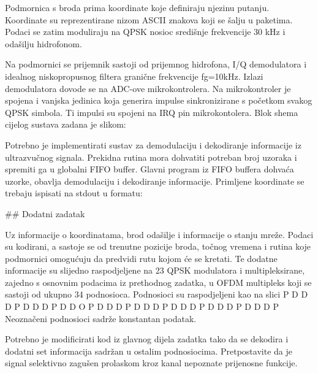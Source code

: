 Podmornica s broda prima koordinate koje definiraju njezinu putanju.
Koordinate su reprezentirane nizom ASCII znakova koji se šalju u paketima. Podaci se zatim moduliraju na QPSK nosioc središnje frekvencije 30 kHz i odašilju hidrofonom.

Na podmornici se prijemnik sastoji od prijemnog hidrofona, I/Q demodulatora i idealnog niskopropusnog filtera granične frekvencije fg=10kHz. Izlazi demodulatora dovode se na ADC-ove mikrokontrolera. Na mikrokontroler je spojena i vanjska jedinica koja generira impulse sinkronizirane s početkom svakog QPSK simbola. Ti impulsi su spojeni na IRQ pin mikrokontolera. Blok shema cijelog sustava zadana je slikom:

Potrebno je implementirati sustav za demodulaciju i dekodiranje informacije iz ultrazvučnog signala. Prekidna rutina mora dohvatiti potreban broj uzoraka i spremiti ga u globalni FIFO buffer. Glavni program iz FIFO buffera dohvaća uzorke, obavlja demodulaciju i dekodiranje informacije. Primljene koordinate se trebaju ispisati na stdout u formatu:



## Dodatni zadatak

Uz informacije o koordinatama, brod odašilje i informacije o stanju mreže. Podaci su kodirani, a sastoje se od trenutne pozicije broda, točnog vremena i rutina koje podmornici omogućuju da predvidi rutu kojom će se kretati. Te dodatne informacije su slijedno raspodjeljene na 23 QPSK modulatora i multipleksirane, zajedno s osnovnim podacima iz prethodnog zadatka, u OFDM multipleks koji se sastoji od ukupno 34 podnosioca. Podnosioci su raspodjeljeni kao na slici
P D D D P D D D P D D O P D D D P D D D P D D D P D D D P D D D P 
Neoznačeni podnosioci sadrže konstantan podatak.

Potrebno je modificirati kod iz glavnog dijela zadatka tako da se dekodira i dodatni set informacija sadržan u ostalim podnosiocima. Pretpostavite da je signal selektivno zagušen prolaskom kroz kanal nepoznate prijenosne funkcije.